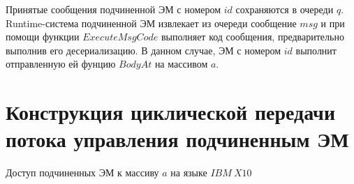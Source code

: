 Принятые сообщения подчиненной ЭМ с номером $id$ сохраняются в очереди $q$.
Runtime-система подчиненной ЭМ извлекает из очереди сообщение $msg$ и при помощи
функции $ExecuteMsgCode$ выполняет код сообщения, предварительно выполнив его
десериализацию. В данном случае, ЭМ с номером $id$ выполнит отправленную ей
фунцию $BodyAt$ на массивом $a$.

\section{Конструкция циклической передачи потока управления подчиненным ЭМ}






\begin{ListingEnv}[ht]
	\small {}
    \caption{Доступ подчиненных ЭМ к массиву $a$ на языке $IBM\ X10$}
    \label{list:r_iterations_loop}
\end{ListingEnv}


